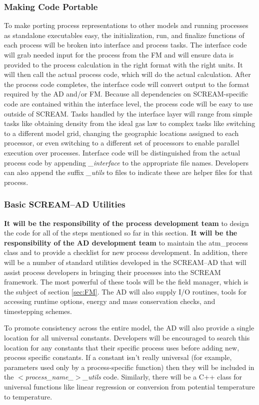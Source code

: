 \subsubsection{Making Code Portable}
To make porting process representations to other models and running processes as standalone executables easy, the initialization, run, and finalize functions of each process will be broken into interface and process tasks. The interface code will grab needed input for the process from the FM and will ensure data is provided to the process calculation in the right format with the right units. It will then call the actual process code, which will do the actual calculation. After the process code completes, the interface code will convert output to the format required by the AD and/or FM. Because all dependencies on SCREAM-specific code are contained within the interface level, the process code will be easy to use outside of SCREAM. Tasks handled by the interface layer will range from simple tasks like obtaining density from the ideal gas law to complex tasks like switching to a different model grid, changing the geographic locations assigned to each processor, or even switching to a different set of processors to enable parallel execution over processes. Interface code will be distinguished from the actual process code by appending \emph{\_interface} to the appropriate file names. Developers can also append the suffix \emph{\_utils} to files to indicate these are helper files for that process.

\subsubsection{Basic SCREAM--AD Utilities}

{\bf It will be the responsibility of the process development team} to design the code for all of the steps mentioned so far in this section.  {\bf It will be the responsibility of the AD development team} to maintain the atm\_process class and to provide a checklist for new process development.  In addition, there will be a number of standard utilities developed in the SCREAM--AD that will assist process developers in bringing their processes into the SCREAM framework. The most powerful of these tools will be the field manager, which is the subject of section \ref{sec:FM}. The AD will also supply I/O routines, tools for accessing runtime options, energy and mass conservation checks, and timestepping schemes.

To promote consistency across the entire model, the AD will also provide a single location for all universal constants.  Developers will be encouraged to search this location for any constants that their specific process uses before adding new, process specific constants. If a constant isn't really universal (for example, parameters used only by a process-specific function) then they will be included in the \emph{$<$process\_name\_$>$\_utils} code. Similarly, there will be a C++ class for universal functions like linear regression or conversion from potential temperature to temperature.

